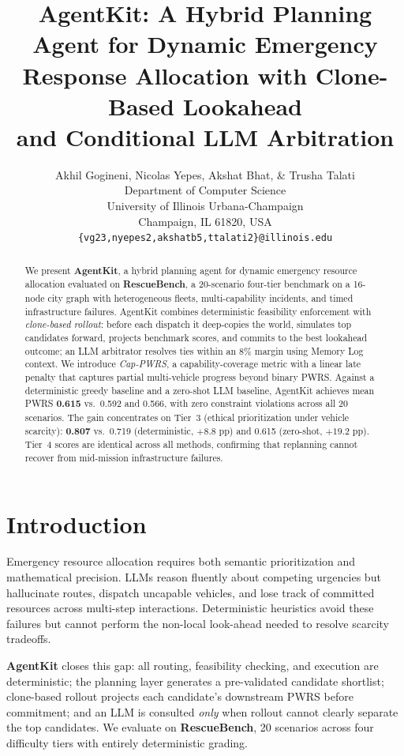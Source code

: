 \documentclass{article}
\title{AgentKit: A Hybrid Planning Agent for Dynamic Emergency\\
Response Allocation with Clone-Based Lookahead\\
and Conditional LLM Arbitration}
\author{Akhil Gogineni, Nicolas Yepes, Akshat Bhat, \& Trusha Talati \\
Department of Computer Science\\
University of Illinois Urbana-Champaign\\
Champaign, IL 61820, USA \\
\texttt{\{vg23,nyepes2,akshatb5,ttalati2\}@illinois.edu}
}
\begin{document}
\maketitle

\begin{abstract}
We present \textbf{AgentKit}, a hybrid planning agent for dynamic emergency
resource allocation evaluated on \textbf{RescueBench}, a 20-scenario
four-tier benchmark on a 16-node city graph with heterogeneous fleets,
multi-capability incidents, and timed infrastructure failures.
AgentKit combines deterministic feasibility enforcement with
\emph{clone-based rollout}: before each dispatch it deep-copies the world,
simulates top candidates forward, projects benchmark scores, and commits to
the best lookahead outcome; an LLM arbitrator resolves ties within an 8\%
margin using Memory Log context.
We introduce \emph{Cap-PWRS}, a capability-coverage metric with a linear late
penalty that captures partial multi-vehicle progress beyond binary PWRS.
Against a deterministic greedy baseline and a zero-shot LLM baseline,
AgentKit achieves mean PWRS \textbf{0.615} vs.\ 0.592 and 0.566, with zero
constraint violations across all 20 scenarios.
The gain concentrates on Tier~3 (ethical prioritization under vehicle
scarcity): \textbf{0.807} vs.\ 0.719 (deterministic, $+8.8$ pp) and 0.615
(zero-shot, $+19.2$ pp).
Tier~4 scores are identical across all methods, confirming that replanning
cannot recover from mid-mission infrastructure failures.
\end{abstract}

\section{Introduction}
\label{sec:intro}

Emergency resource allocation requires both semantic prioritization and
mathematical precision.
LLMs reason fluently about competing urgencies but hallucinate routes, dispatch
uncapable vehicles, and lose track of committed resources across multi-step
interactions.
Deterministic heuristics avoid these failures but cannot perform the
non-local look-ahead needed to resolve scarcity tradeoffs.

\textbf{AgentKit} closes this gap: all routing, feasibility checking, and
execution are deterministic; the planning layer generates a pre-validated
candidate shortlist; clone-based rollout projects each candidate's downstream
PWRS before commitment; and an LLM is consulted \emph{only} when rollout
cannot clearly separate the top candidates.
We evaluate on \textbf{RescueBench}, 20 scenarios across four difficulty tiers
with entirely deterministic grading.
\end{document}
